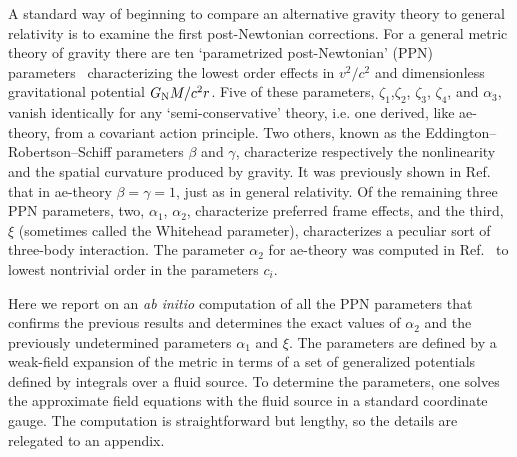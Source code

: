 \documentclass[aps,prd,preprint,amsmath,amssymb]{revtex4}
\def\a{\alpha}
\begin{document}
A standard way of beginning to compare an alternative gravity
theory to general relativity is to examine the first
post-Newtonian corrections. For a general metric theory of gravity
there are ten `parametrized post-Newtonian' (PPN)
parameters~\cite{WillBook,WillReview} characterizing the lowest
order effects in $v^2/c^2$ and dimensionless gravitational
potential $G_{\rm N}M/c^2r$. Five of these parameters,
$\zeta_1$,$\zeta_2$, $\zeta_3$, $\zeta_4$, and $\alpha_3$, vanish
identically for any `semi-conservative' theory, i.e. one derived,
like ae-theory, from a covariant action principle. Two others,
known as the Eddington--Robertson--Schiff parameters $\beta$ and
$\gamma$, characterize respectively the nonlinearity and the
spatial curvature produced by gravity. It was previously shown in
Ref.~\cite{ElingJ1} that in ae-theory $\beta=\gamma=1$, just as
in general relativity. Of the remaining three PPN parameters, two,
$\a_1$, $\a_2$, characterize preferred frame effects, and the
third, $\xi$ (sometimes called the Whitehead parameter),
characterizes a peculiar sort of three-body interaction.  The
parameter $\a_2$ for ae-theory was computed in
Ref.~\cite{Graesser:2005bg} to lowest nontrivial order in the
parameters $c_i$.

Here we report on an \textit{ab initio} computation of all the PPN
parameters that confirms the previous results and determines the
exact values of $\a_2$ and the previously undetermined parameters
$\a_1$ and $\xi$. The parameters are defined by a weak-field
expansion of the metric in terms of a set of generalized
potentials defined by integrals over a fluid source. To determine
the parameters, one solves the approximate field equations with
the fluid source in a standard coordinate gauge. The computation
is straightforward but lengthy, so the details are relegated to an
appendix.
\end{document}

